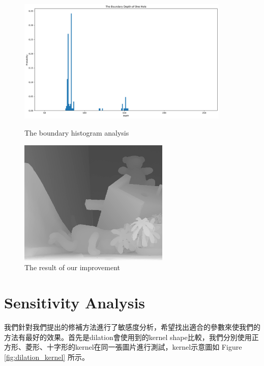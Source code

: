 \documentclass{article}
\begin{document}
\begin{CJK*}{UTF8}{bkai}
\begin{figure}[h]
\centering
    \begin{minipage}{.45\textwidth}
        \centering
        \includegraphics[width=0.9\textwidth]{results/historgram.png}
        \caption{The boundary histogram analysis}
        \label{fig:histogram_of_boundary}
    \end{minipage}
    \begin{minipage}{.45\textwidth}
        \centering
        \includegraphics[width=0.64\textwidth]{results/plus.png}
        \caption{The result of our improvement}
        \label{fig:result_of_our_improvement}
    \end{minipage}
\end{figure}


\section{Sensitivity Analysis}

我們針對我們提出的修補方法進行了敏感度分析，希望找出適合的參數來使我們的方法有最好的效果。首先是dilation會使用到的kernel shape比較，我們分別使用正方形、菱形、十字形的kernel在同一張圖片進行測試，kernel示意圖如 Figure \ref{fig:dilation_kernel} 所示。


\end{CJK*}
\end{document}
